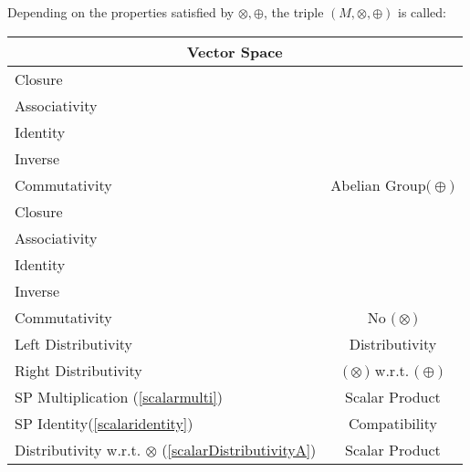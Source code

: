 \documentclass[a4paper,12pt]{scrartcl}    %
\newcommand{\OpA}{\otimes}
\newcommand{\OpB}{\oplus}
\begin{document}
\begin{landscape}
\begin{minipage}[c][\textheight]{0.30 \linewidth}
			Depending on the properties satisfied by $\OpA,\OpB$, the triple $(M,\OpA,\OpB)$ is called:
		\vfill
	\end{minipage}
	\hspace{1cm}
	\begin{minipage}[t][]{0.60 \linewidth}
		\begin{minipage}[c]{0,5\textwidth}	
			\begin{tabular}{|l|c|} %
			  \hline
			  \multicolumn{2}{c}{\cellcolor{green!25}Vector Space} \\
			  \hline
			    \cellcolor{blue!25} \footnotesize Closure& \cellcolor{yellow!25}  \\
			    \cellcolor{blue!25} \footnotesize Associativity& \cellcolor{yellow!25}  \\
			    \cellcolor{blue!25} \footnotesize Identity& \cellcolor{yellow!25} \\
			    \cellcolor{blue!25} \footnotesize Inverse& \cellcolor{yellow!25} \\
			    \cellcolor{blue!25} \footnotesize Commutativity& \multirow{-5}{*}{\tiny\cellcolor{yellow!25}Abelian Group$\big(\OpB\big)$} \\
			   \hline
			    \cellcolor{red!25} \footnotesize Closure& \cellcolor{red!25}  \\
			    \cellcolor{red!25} \footnotesize Associativity& \cellcolor{red!25}  \\
			    \cellcolor{red!25} \footnotesize Identity& \cellcolor{red!25} \\
			    \cellcolor{red!25} \footnotesize Inverse& \cellcolor{red!25} \\
			    \cellcolor{red!25} \footnotesize Commutativity& \multirow{-5}{*}{\tiny\cellcolor{red!25} No $\big(\OpA\big)$} \\
			  \hline
			  	\cellcolor{red!25} \footnotesize Left Distributivity&  \tiny\cellcolor{red!25}Distributivity\\
			    \cellcolor{red!25} \footnotesize Right Distributivity & \tiny\cellcolor{red!25} $\big(\OpA\big)$ w.r.t. $\big(\OpB\big)$  \\
			   \hline
			  \hline
			     \cellcolor{blue!25} \footnotesize SP Multiplication (\ref{scalarmulti})&  \tiny\cellcolor{yellow!25}Scalar Product\\
			    \cellcolor{blue!25} \footnotesize SP Identity(\ref{scalaridentity}) & \tiny\cellcolor{yellow!25} Compatibility  \\
			   \hline 
			    \cellcolor{blue!25} \footnotesize Distributivity w.r.t. $\OpA$ (\ref{scalarDistributivityA})&  \tiny\cellcolor{yellow!25}Scalar Product\\

\end{tabular}
\end{minipage}
\end{minipage}
\end{landscape}
\end{document}
